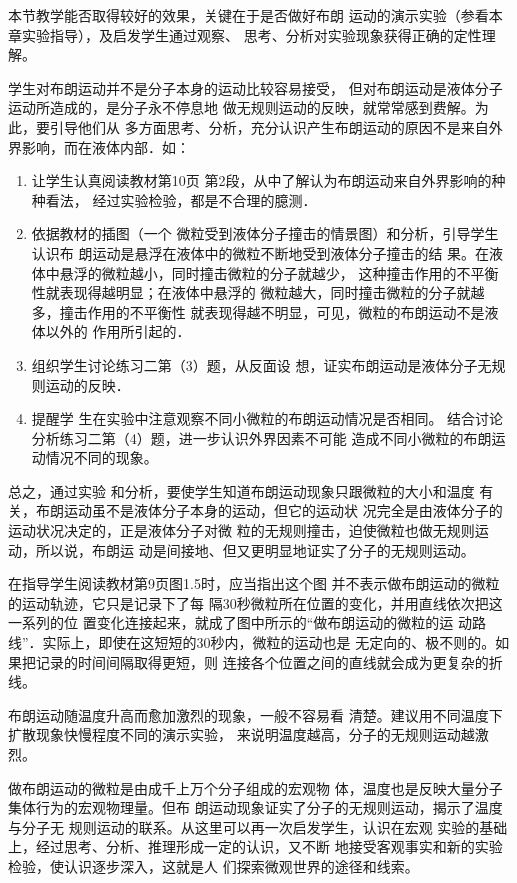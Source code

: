 本节教学能否取得较好的效果，关键在于是否做好布朗
运动的演示实验（参看本章实验指导），及启发学生通过观察、
思考、分析对实验现象获得正确的定性理解。

学生对布朗运动并不是分子本身的运动比较容易接受，
但对布朗运动是液体分子运动所造成的，是分子永不停息地
做无规则运动的反映，就常常感到费解。为此，要引导他们从
多方面思考、分析，充分认识产生布朗运动的原因不是来自外
界影响，而在液体内部．如：
\begin{enumerate}
\item 让学生认真阅读教材第10页
第2段，从中了解认为布朗运动来自外界影响的种种看法，
经过实验检验，都是不合理的臆测．    \item 依据教材的插图（一个
微粒受到液体分子撞击的情景图）和分析，引导学生认识布
朗运动是悬浮在液体中的微粒不断地受到液体分子撞击的结
果。在液体中悬浮的微粒越小，同时撞击微粒的分子就越少，
这种撞击作用的不平衡性就表现得越明显；在液体中悬浮的
微粒越大，同时撞击微粒的分子就越多，撞击作用的不平衡性
就表现得越不明显，可见，微粒的布朗运动不是液体以外的
作用所引起的．    \item 组织学生讨论练习二第（3）题，从反面设
想，证实布朗运动是液体分子无规则运动的反映．    \item 提醒学
生在实验中注意观察不同小微粒的布朗运动情况是否相同。 结合讨论分析练习二第（4）题，进一步认识外界因素不可能
造成不同小微粒的布朗运动情况不同的现象。
\end{enumerate}

总之，通过实验
和分析，要使学生知道布朗运动现象只跟微粒的大小和温度
有关，布朗运动虽不是液体分子本身的运动，但它的运动状
况完全是由液体分子的运动状况决定的，正是液体分子对微
粒的无规则撞击，迫使微粒也做无规则运动，所以说，布朗运
动是间接地、但又更明显地证实了分子的无规则运动。

在指导学生阅读教材第9页图1.5时，应当指出这个图
并不表示做布朗运动的微粒的运动轨迹，它只是记录下了每
隔30秒微粒所在位置的变化，并用直线依次把这一系列的位
置变化连接起来，就成了图中所示的“做布朗运动的微粒的运
动路线”．实际上，即使在这短短的30秒内，微粒的运动也是
无定向的、极不则的。如果把记录的时间间隔取得更短，则
连接各个位置之间的直线就会成为更复杂的折线。

布朗运动随温度升高而愈加激烈的现象，一般不容易看
清楚。建议用不同温度下扩散现象快慢程度不同的演示实验，
来说明温度越高，分子的无规则运动越激烈。

做布朗运动的微粒是由成千上万个分子组成的宏观物
体，温度也是反映大量分子集体行为的宏观物理量。但布
朗运动现象证实了分子的无规则运动，揭示了温度与分子无
规则运动的联系。从这里可以再一次启发学生，认识在宏观
实验的基础上，经过思考、分析、推理形成一定的认识，又不断
地接受客观事实和新的实验检验，使认识逐步深入，这就是人
们探索微观世界的途径和线索。

